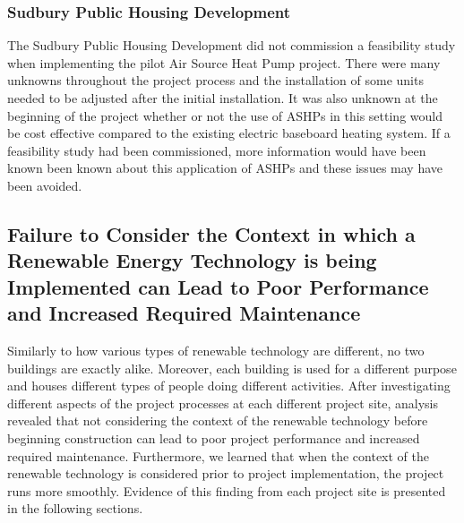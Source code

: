 \subsubsection{Sudbury Public Housing Development}
\par The Sudbury Public Housing Development did not commission a feasibility study when implementing the pilot Air Source Heat Pump project. There were many unknowns throughout the project process and the installation of some units needed to be adjusted after the initial installation. It was also unknown at the beginning of the project whether or not the use of ASHPs in this setting would be cost effective compared to the existing electric baseboard heating system. If a feasibility study had been commissioned, more information would have been known been known about this application of ASHPs and these issues may have been avoided.

\subsection{Failure to Consider the Context in which a Renewable Energy Technology is being Implemented can Lead to Poor Performance and Increased Required Maintenance}
\par Similarly to how various types of renewable technology are different, no two buildings are exactly alike. Moreover, each building is used for a different purpose and houses different types of people doing different activities. After investigating different aspects of the project processes at each different project site, analysis revealed that not considering the context of the renewable technology before beginning construction can lead to poor project performance and increased required maintenance. Furthermore, we learned that when the context of the renewable technology is considered prior to project implementation, the project runs more smoothly. Evidence of this finding from each project site is presented in the following sections.

